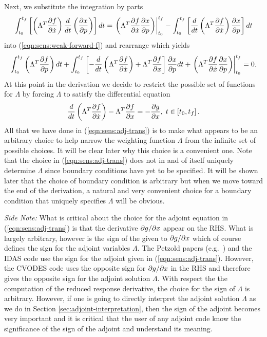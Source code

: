 \documentclass[pdf,ps2pdf,11pt]{SANDreport}
\begin{document}
Next, we substitute the integration by parts
%
\begin{equation}
\int_{t_0}^{t_f} \left[ \left( \Lambda^T \displaystyle{\frac{\partial f}{\partial \dot{x}}} \right) \frac{d}{dt}\left( \displaystyle{\frac{\partial x}{\partial p}} \right) \right] dt
= \left. \left( \Lambda^T \displaystyle{\frac{\partial f}{\partial \dot{x}}} \displaystyle{\frac{\partial x}{\partial p}} \right) \right|_{t_0}^{t_f}
- \int_{t_0}^{t_f} \left[ \frac{d}{dt}\left( \Lambda^T \displaystyle{\frac{\partial f}{\partial \dot{x}}} \right) \displaystyle{\frac{\partial x}{\partial p}} \right] dt
\end{equation}
%
into (\ref{eqn:sens:weak-forward-f}) and rearrange which yields
%
\begin{equation}
\int_{t_0}^{t_f} \left( \Lambda^T \displaystyle{\frac{\partial f}{\partial p}} \right) dt
+ \int_{t_0}^{t_f} \left[
    - \frac{d}{dt}\left( \Lambda^T \displaystyle{\frac{\partial f}{\partial \dot{x}}} \right)
    + \Lambda^T \displaystyle{\frac{\partial f}{\partial x}}
  \right] \displaystyle{\frac{\partial x}{\partial p}} dt
+ \left. \left( \Lambda^T \displaystyle{\frac{\partial f}{\partial \dot{x}}} \displaystyle{\frac{\partial x}{\partial p}} \right) \right|_{t_0}^{t_f}
= 0.
\label{eqn:sens:weak-forward-f-2}
\end{equation}
%
At this point in the derivation we decide to restrict the possible set of
functions for $\Lambda$ by forcing $\Lambda$ to satisfy the differential
equation
%
\begin{equation}
\frac{d}{dt}\left( \Lambda^T \displaystyle{\frac{\partial f}{\partial \dot{x}}} \right)
-  \Lambda^T \displaystyle{\frac{\partial f}{\partial x}} = - \displaystyle{\frac{\partial g}{\partial x}}, \; t \in \left[ t_0, t_f \right].
\label{eqn:sens:adj-trans}
\end{equation}
%
All that we have done in (\ref{eqn:sens:adj-trans}) is to make what appears to
be an arbitrary choice to help narrow the weighting function $\Lambda$ from
the infinite set of possible choices.  It will be clear later why this choice
is a convenient one.  Note that the choice in (\ref{eqn:sens:adj-trans}) does
not in and of itself uniquely determine $\Lambda$ since boundary conditions
have yet to be specified.  It will be shown later that the choice of boundary
condition is arbitrary but when we move toward the end of the derivation, a
natural and very convenient choice for a boundary condition that uniquely
specifies $\Lambda$ will be obvious.

{}\noindent\textit{Side Note:} What is critical about the choice for the
adjoint equation in (\ref{eqn:sens:adj-trans}) is that the derivative
$\partial g / \partial x$ appear on the RHS.  What is largely arbitrary, however is the
sign of the given to $\partial g / \partial x$ which of course defines the sign for the
adjoint variables $\Lambda$.  The Petzold papers (e.g.\
{}\cite{adjoint-sens-2003}) and the IDAS code {}\cite{sundials} use the sign
for the adjoint given in (\ref{eqn:sens:adj-trans}).  However, the CVODES code
{}\cite{cvodes,sundials} uses the opposite sign for $\partial g / \partial x$ in the RHS
and therefore gives the opposite sign for the adjoint solution $\Lambda$.
With respect the the computation of the reduced response derivative, the
choice for the sign of $\Lambda$ is arbitrary.  However, if one is going to
directly interpret the adjoint solution $\Lambda$ as we do in Section
{}\ref{sec:adjoint-interpretation}, then the sign of the adjoint becomes very
important and it is critical that the user of any adjoint code know the
significance of the sign of the adjoint and understand its meaning.
\end{document}
